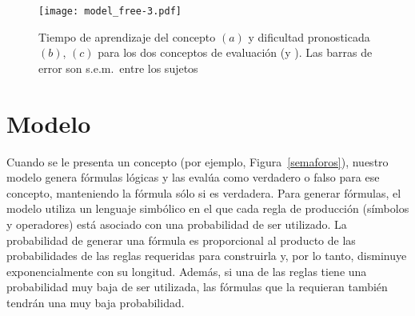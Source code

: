 \begin{figure}[t!]
      \texttt{[image: model\_free-3.pdf]}
      \centering
      \caption{Tiempo de aprendizaje del concepto $(a)$ y dificultad pronosticada $(b)$, $(c)$ para los dos conceptos de evaluación (\testa y \testb). Las barras de error son s.e.m.\ entre los sujetos}
      \label{model free}
   \end{figure}
   
\section{Modelo}



Cuando se le presenta un concepto (por ejemplo, Figura~\ref{semaforos}), nuestro modelo genera fórmulas lógicas y las evalúa como verdadero o falso para ese concepto, manteniendo la fórmula sólo si es verdadera. Para generar fórmulas, el modelo utiliza un lenguaje simbólico en el que cada regla de producción (símbolos y operadores) está asociado con una probabilidad de ser utilizado. La probabilidad de generar una fórmula es proporcional al producto de las probabilidades de las reglas requeridas para construirla y, por lo tanto, disminuye exponencialmente con su longitud. Además, si una de las reglas tiene una probabilidad muy baja de ser utilizada, las fórmulas que la requieran también tendrán una muy baja probabilidad.

